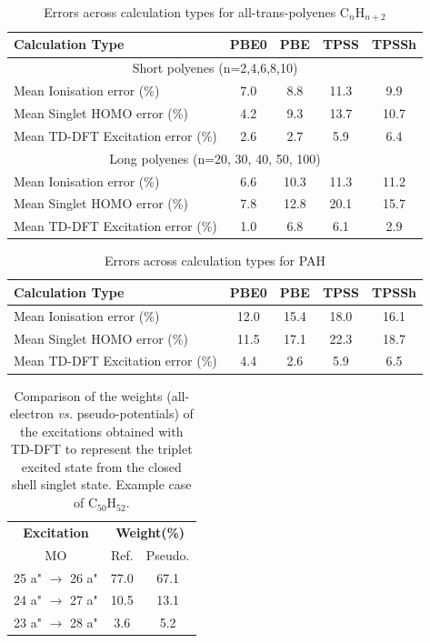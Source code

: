 \documentclass[12pt]{article}
\begin{document}
\begin{table}[h]
\caption{Errors across calculation types for all-trans-polyenes C$_n$H$_{n+2}$}
\begin{tabular}{|l| c| c| c| c |}
\hline
\textbf{Calculation Type} & \textbf{PBE0} & \textbf{PBE} & \textbf{TPSS} & \textbf{TPSSh} \\
\hline
\multicolumn{5}{|c|}{Short polyenes (n=2,4,6,8,10)}\\
\hline
Mean Ionisation  error (\%) & 7.0 & 8.8 & 11.3 & 9.9 \\\hline
Mean Singlet HOMO  error (\%) & 4.2 & 9.3 & 13.7 & 10.7 \\\hline
Mean TD-DFT Excitation error (\%) & 2.6 & 2.7 & 5.9 & 6.4 \\ 
\hline
\multicolumn{5}{|c|}{Long polyenes (n=20, 30, 40, 50, 100)}\\
\hline
Mean Ionisation  error (\%) & 6.6 & 10.3 & 11.3 & 11.2 \\\hline
Mean Singlet HOMO  error (\%) & 7.8 & 12.8 & 20.1 & 15.7 \\\hline
Mean TD-DFT Excitation error (\%) & 1.0 & 6.8 & 6.1 & 2.9 \\
\hline
\end{tabular}
\label{table:alkene_errors}
\end{table}

\newpage

\begin{table}[h]
\caption{Errors across calculation types for PAH}
\begin{tabular}{|l |c |c |c |c |}
\hline
\textbf{Calculation Type} & \textbf{PBE0} & \textbf{PBE} & \textbf{TPSS} & \textbf{TPSSh} \\
\hline
Mean Ionisation  error (\%) & 12.0 & 15.4 & 18.0 & 16.1 \\\hline
Mean Singlet HOMO  error (\%) & 11.5 & 17.1 & 22.3 & 18.7 \\\hline
Mean TD-DFT Excitation error (\%) & 4.4 & 2.6 & 5.9 & 6.5 \\
\hline
\end{tabular}
\label{table:ring_system_errors}
\end{table}

\newpage
\begin{table}
\caption{\label{tab:coef}Comparison of the weights (all-electron \emph{vs.} pseudo-potentials)
of the excitations obtained with TD-DFT
to represent the triplet excited state from the closed shell singlet state.
Example case of C$_{50}$H$_{52}$.}
\begin{tabular}{|c |c |c |c|}
\hline
\multicolumn{2}{|c|}{\textbf{Excitation}} & \multicolumn{2}{c|}{\textbf{Weight(\%)}}\\
\multicolumn{2}{|c|}{MO} & Ref. & Pseudo.\\
\hline
\multicolumn{2}{|c|}{25 a" \(\rightarrow\) 26 a"} & 77.0 &   67.1  \\\hline
\multicolumn{2}{|c|}{24 a" \(\rightarrow\) 27 a"} & 10.5 &   13.1  \\\hline
\multicolumn{2}{|c|}{23 a" \(\rightarrow\) 28 a"} & 3.6  &    5.2  \\
\hline
\end{tabular}
\end{table}
\end{document}
